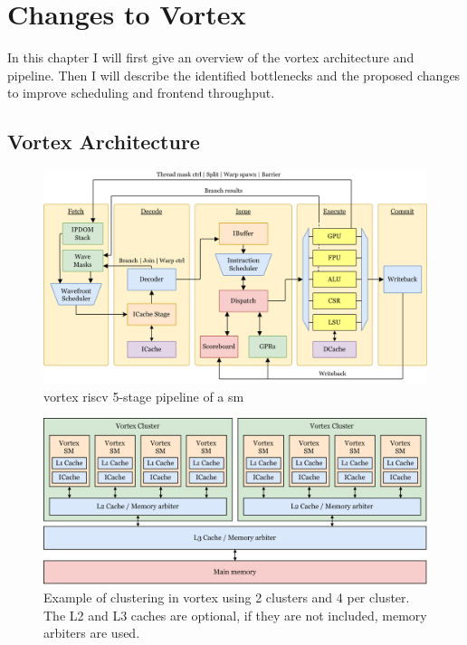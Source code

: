 \chapter{Changes to Vortex} \label{chap:changes}

In this chapter I will first give an overview of the \Gls{vortex} architecture and pipeline. Then I will describe the identified bottlenecks and the proposed changes to improve scheduling and frontend throughput. 

\section{Vortex Architecture}

\begin{figure}
    \centering
    \includegraphics[width=\textwidth]{figures/vortex-pipeline2-no-background.png}
    \caption{\Gls{vortex} \Gls{riscv} 5-stage pipeline of a \acrfull{sm}}
    \label{fig:vortex_microarchitecture}
\end{figure}

\begin{figure}
    \centering
    \includegraphics[width=\textwidth]{figures/vortex-cluster-color.png}
    \caption[Clustering of  in \Gls{vortex}.]{Example of  clustering in \Gls{vortex} using 2 clusters and 4  per cluster. The L2 and L3 caches are optional, if they are not included, memory arbiters are used.}
    \label{fig:clustering}
\end{figure}

